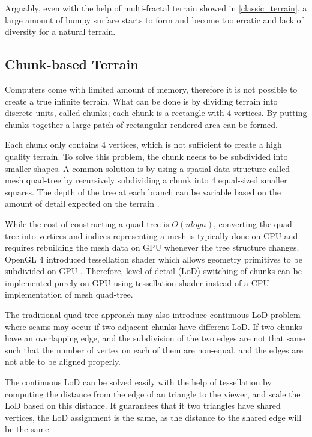 \documentclass[oneside, a4paper]{report}
\begin{document}
    Arguably, even with the help of multi-fractal terrain showed in \ref{classic_terrain}, a large amount of bumpy surface starts to form and become too erratic and lack of diversity for a natural terrain.

    \subsection{Chunk-based Terrain}

    Computers come with limited amount of memory, therefore it is not possible to create a true infinite terrain. What can be done is by dividing terrain into discrete units, called chunks; each chunk is a rectangle with 4 vertices. By putting chunks together a large patch of rectangular rendered area can be formed.

    Each chunk only contains 4 vertices, which is not sufficient to create a high quality terrain. To solve this problem, the chunk needs to be subdivided into smaller shapes. A common solution is by using a spatial data structure called mesh quad-tree \cite{quadtree} by recursively subdividing a chunk into 4 equal-sized smaller squares. The depth of the tree at each branch can be variable based on the amount of detail expected on the terrain \cite{clod_terrain}.

    While the cost of constructing a quad-tree is \(O(n log n)\), converting the quad-tree into vertices and indices representing a mesh is typically done on CPU and requires rebuilding the mesh data on GPU whenever the tree structure changes. OpenGL 4 introduced tessellation shader which allows geometry primitives to be subdivided on GPU \cite{opengl4_spec}. Therefore, level-of-detail (LoD) switching of chunks can be implemented purely on GPU using tessellation shader instead of a CPU implementation of mesh quad-tree.

    The traditional quad-tree approach may also introduce continuous LoD problem where seams may occur if two adjacent chunks have different LoD. If two chunks have an overlapping edge, and the subdivision of the two edges are not that same such that the number of vertex on each of them are non-equal, and the edges are not able to be aligned properly.

    The continuous LoD can be solved easily with the help of tessellation by computing the distance from the edge of an triangle to the viewer, and scale the LoD based on this distance. It guarantees that it two triangles have shared vertices, the LoD assignment is the same, as the distance to the shared edge will be the same.
\end{document}
